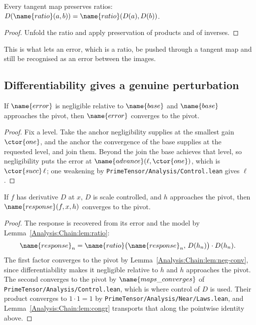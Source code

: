 \begin{lemma}\label{Analysis:Chain:lem:map-ratio}
Every tangent map preserves ratios:
$D(\name{ratio}(a,b)) = \name{ratio}(D(a), D(b))$.
\end{lemma}

\begin{proof}
Unfold the ratio and apply preservation of products and of inverses.
\end{proof}

This is what lets an error, which is a ratio, be pushed through a tangent map
and still be recognised as an error between the images.

\subsection{Differentiability gives a genuine perturbation}

\begin{lemma}\label{Analysis:Chain:lem:neg-conv}
If $\name{error}$ is negligible relative to $\name{base}$ and $\name{base}$
approaches the pivot, then $\name{error}$ converges to the pivot.
\end{lemma}

\begin{proof}
Fix a level.  Take the anchor negligibility supplies at the smallest gain
$\ctor{one}$, and the anchor the convergence of the base supplies at the
requested level, and join them.  Beyond the join the base achieves that level,
so negligibility puts the error at $\name{advance}(\ell, \ctor{one})$, which is
$\ctor{succ}\,\ell$; one weakening by
\texttt{PrimeTensor/Analysis/Control.lean} gives $\ell$.
\end{proof}

\begin{theorem}\label{Analysis:Chain:thm:resp-conv}
If $f$ has derivative $D$ at $x$, $D$ is scale controlled, and $h$ approaches
the pivot, then $\name{response}(f,x,h)$ converges to the pivot.
\end{theorem}

\begin{proof}
The response is recovered from its error and the model by
Lemma~\ref{Analysis:Chain:lem:ratio}:
\[
  \name{response}_n
    = \name{ratio}\bigl(\name{response}_n,\, D(h_n)\bigr) \cdot D(h_n).
\]
The first factor converges to the pivot by
Lemma~\ref{Analysis:Chain:lem:neg-conv}, since differentiability makes it
negligible relative to $h$ and $h$ approaches the pivot.  The second converges
to the pivot by $\name{maps\_converges}$ of
\texttt{PrimeTensor/Analysis/Control.lean}, which is where control of $D$ is
used.  Their product converges to $1 \cdot 1 = 1$ by
\texttt{PrimeTensor/Analysis/Near/Laws.lean}, and
Lemma~\ref{Analysis:Chain:lem:congr} transports that along the pointwise
identity above.
\end{proof}

